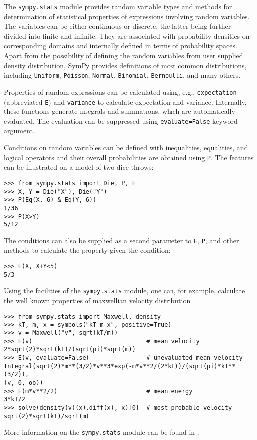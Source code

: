The \verb|sympy.stats| module provides random variable types and methods for
determination of statistical properties of expressions involving random
variables. The variables can be either continuous or discrete, the latter being
further divided into finite and infinite. They are associated
with probability densities on corresponding domains and internally defined
in terms of probability spaces. 
Apart from the possibility of defining the random variables from user supplied
density distribution, SymPy provides definitions of most common
distributions, including \texttt{Uniform}, \texttt{Poisson}, \texttt{Normal},
\texttt{Binomial}, \texttt{Bernoulli}, and many others.

Properties of random expressions can be calculated using, e.g.,
\texttt{expectation} (abbreviated \texttt{E}) and \texttt{variance} to
calculate expectation and variance. Internally, these functions generate
integrals and summations, which are automatically evaluated. The evaluation
can be suppressed using \texttt{evaluate=False} keyword argument.

Conditions on random variables can be defined with inequalities, equalities,
and logical operators and their overall probabilities are obtained using
\texttt{P}. The features can be illustrated on a model of two dice throws:
\begin{verbatim}
>>> from sympy.stats import Die, P, E
>>> X, Y = Die("X"), Die("Y")
>>> P(Eq(X, 6) & Eq(Y, 6))
1/36
>>> P(X>Y)
5/12
\end{verbatim}
The conditions can also be supplied as a second parameter to \texttt{E},
\texttt{P}, and other methods to calculate the property given the condition:
\begin{verbatim}
>>> E(X, X+Y<5)
5/3
\end{verbatim}

Using the facilities of the \texttt{sympy.stats} module, one can, for
example, calculate 
the well known properties of maxwellian velocity distribution
\begin{verbatim}
>>> from sympy.stats import Maxwell, density
>>> kT, m, x = symbols("kT m x", positive=True)
>>> v = Maxwell("v", sqrt(kT/m))
>>> E(v)                                # mean velocity
2*sqrt(2)*sqrt(kT)/(sqrt(pi)*sqrt(m))
>>> E(v, evaluate=False)                # unevaluated mean velocity
Integral(sqrt(2)*m**(3/2)*v**3*exp(-m*v**2/(2*kT))/(sqrt(pi)*kT**(3/2)),
(v, 0, oo))
>>> E(m*v**2/2)                         # mean energy
3*kT/2
>>> solve(density(v)(x).diff(x), x)[0]  # most probable velocity
sqrt(2)*sqrt(kT)/sqrt(m)
\end{verbatim}

More information on the \texttt{sympy.stats} module can be found in
\cite{StatsMRocklin}.
